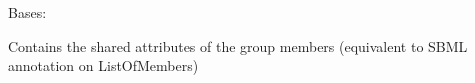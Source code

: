 \documentclass[letterpaper,12pt,english]{sphinxmanual}
\begin{document}
\begin{fulllineitems}
\label{\detokenize{api/core:cbmpy.CBModel.GroupMemberAttributes}}
\pysigstartsignatures
\pysigline
{}
\pysigstopsignatures
\sphinxAtStartPar
Bases: {\hyperref[\detokenize{api/core:cbmpy.CBModel.Fbase}]{}}

\sphinxAtStartPar
Contains the shared attributes of the group members (equivalent to SBML
annotation on ListOfMembers)

\begin{fulllineitems}
\label{\detokenize{api/core:cbmpy.CBModel.GroupMemberAttributes.__init__}}
\pysigstartsignatures
\pysiglinewithargsret
{}
{}
{}
\pysigstopsignatures
\end{fulllineitems}


\end{fulllineitems}

\end{document}
